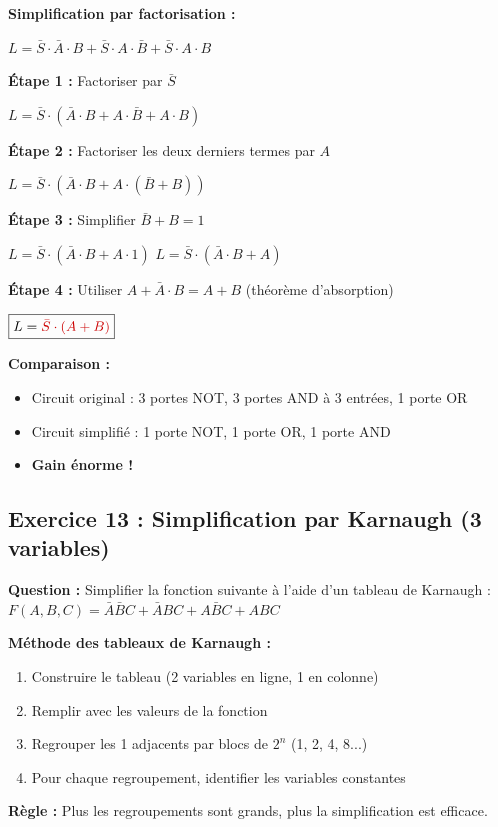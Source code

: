 \documentclass[12pt,a4paper]{article}
\begin{document}
\begin{solution}
\textbf{Simplification par factorisation :}

$L = \bar{S} \cdot \bar{A} \cdot B + \bar{S} \cdot A \cdot \bar{B} + \bar{S} \cdot A \cdot B$

\textbf{Étape 1 :} Factoriser par $\bar{S}$

$L = \bar{S} \cdot (\bar{A} \cdot B + A \cdot \bar{B} + A \cdot B)$

\textbf{Étape 2 :} Factoriser les deux derniers termes par $A$

$L = \bar{S} \cdot (\bar{A} \cdot B + A \cdot (\bar{B} + B))$

\textbf{Étape 3 :} Simplifier $\bar{B} + B = 1$

$L = \bar{S} \cdot (\bar{A} \cdot B + A \cdot 1)$
$L = \bar{S} \cdot (\bar{A} \cdot B + A)$

\textbf{Étape 4 :} Utiliser $A + \bar{A} \cdot B = A + B$ (théorème d'absorption)

$\boxed{L = \textcolor{importantrouge}{\bar{S} \cdot (A + B)}}$

\textbf{Comparaison :}
\begin{itemize}
    \item Circuit original : 3 portes NOT, 3 portes AND à 3 entrées, 1 porte OR
    \item Circuit simplifié : 1 porte NOT, 1 porte OR, 1 porte AND
    \item \textcolor{defvert}{\textbf{Gain énorme !}}
\end{itemize}
\end{solution}

\newpage
\subsection{Exercice 13 : Simplification par Karnaugh (3 variables)}

\begin{exercice}
\textbf{Question :} Simplifier la fonction suivante à l'aide d'un tableau de Karnaugh :
$F(A,B,C) = \bar{A}\bar{B}C + \bar{A}BC + A\bar{B}C + ABC$
\end{exercice}

\begin{methode}
\textbf{Méthode des tableaux de Karnaugh :}

\begin{enumerate}
    \item Construire le tableau (2 variables en ligne, 1 en colonne)
    \item Remplir avec les valeurs de la fonction
    \item Regrouper les 1 adjacents par blocs de $2^n$ (1, 2, 4, 8...)
    \item Pour chaque regroupement, identifier les variables constantes
\end{enumerate}

\textbf{Règle :} Plus les regroupements sont grands, plus la simplification est efficace.
\end{methode}
\end{document}
